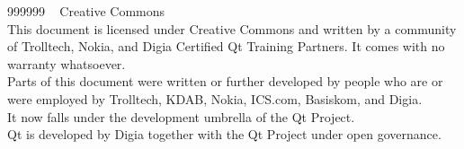   \begin{slide}{999999}
    \vspace{1em}
    \textcopyright~ Creative Commons\\
    This document is licensed under Creative Commons and written by
    a community of Trolltech, Nokia, and Digia Certified Qt Training
    Partners. It comes with no warranty whatsoever. \\
    Parts of this document were written or further developed by people
    who are or were employed by Trolltech, KDAB, Nokia, ICS.com,
    Basiskom, and Digia. \\
    It now falls under the development umbrella of the Qt Project. \\
    Qt is developed by Digia together with the Qt Project under open
    governance.\\
    \\
  \end{slide}
